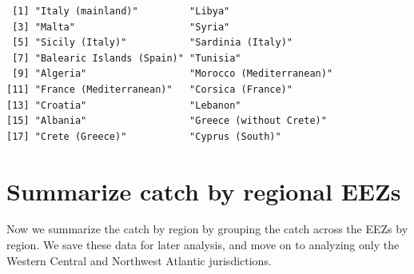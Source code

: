 \documentclass[
  letterpaper,
  oneside,
  open=any]{scrbook}
\begin{document}
\begin{verbatim}
 [1] "Italy (mainland)"         "Libya"                   
 [3] "Malta"                    "Syria"                   
 [5] "Sicily (Italy)"           "Sardinia (Italy)"        
 [7] "Balearic Islands (Spain)" "Tunisia"                 
 [9] "Algeria"                  "Morocco (Mediterranean)" 
[11] "France (Mediterranean)"   "Corsica (France)"        
[13] "Croatia"                  "Lebanon"                 
[15] "Albania"                  "Greece (without Crete)"  
[17] "Crete (Greece)"           "Cyprus (South)"          
\end{verbatim}

\section{Summarize catch by regional
EEZs}\label{summarize-catch-by-regional-eezs}

Now we summarize the catch by region by grouping the catch across the
EEZs by region. We save these data for later analysis, and move on to
analyzing only the Western Central and Northwest Atlantic jurisdictions.
\end{document}
